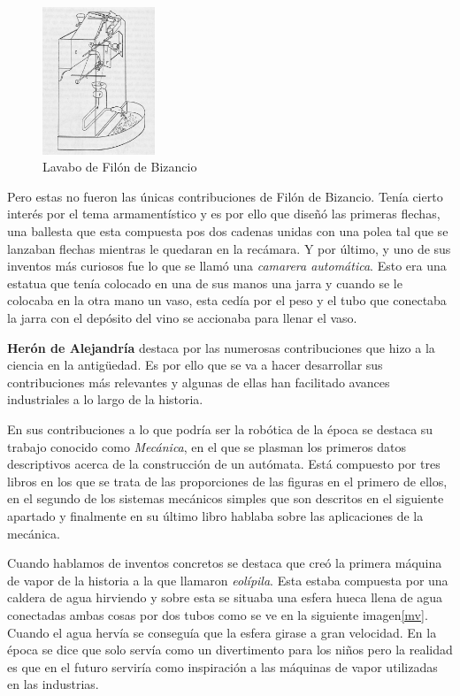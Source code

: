 \begin{figure}[H]
\begin{center}
  \includegraphics[width=0.3\textwidth]{./EtapaPrimeriza/imagenes/lavabo.jpg}
  \caption{Lavabo de Filón de Bizancio}
  \label{lavabo}
\end{center}
\end{figure}

Pero estas no fueron las únicas contribuciones de Filón de Bizancio. Tenía cierto interés por el tema armamentístico y es por ello que diseñó las primeras flechas, una ballesta que esta compuesta pos dos cadenas unidas con una polea tal que se lanzaban flechas mientras le quedaran en la recámara. Y por último, y uno de sus inventos más curiosos fue lo que se llamó una \textit{camarera automática}. Esto era una estatua que tenía colocado en una de sus manos una jarra y cuando se le colocaba en la otra mano un vaso, esta cedía por el peso y el tubo que conectaba la jarra con el depósito del vino se accionaba para llenar el vaso. 



\textbf{Herón de Alejandría} destaca por las numerosas contribuciones que hizo a la ciencia en la antigüedad. Es por ello que se va a hacer desarrollar sus contribuciones más relevantes y algunas de ellas han facilitado avances industriales a lo largo de la historia.

En sus contribuciones a lo que podría ser la robótica de la época se destaca su trabajo conocido como \textit{Mecánica}, en el que se plasman los primeros datos descriptivos acerca de la construcción de un autómata. Está compuesto por tres libros en los que se trata de las proporciones de las figuras en el primero de ellos, en el segundo de los sistemas mecánicos simples que son descritos en el siguiente apartado y finalmente en su último libro hablaba sobre las aplicaciones de la mecánica.

Cuando hablamos de inventos concretos se destaca que creó la primera máquina de vapor de la historia a la que llamaron \textit{eolípila}. Esta estaba compuesta por una caldera de agua hirviendo y sobre esta se situaba una esfera hueca llena de agua conectadas ambas cosas por dos tubos como se ve en la siguiente imagen\ref{mv}. Cuando el agua hervía se conseguía que la esfera girase a gran velocidad. En la época se dice que solo servía como un divertimento para los niños pero la realidad es que en el futuro serviría como inspiración a las máquinas de vapor utilizadas en las industrias.

